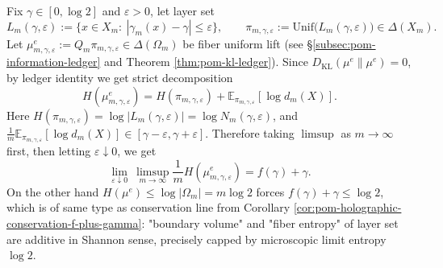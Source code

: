 \begin{remark}\label{rem:pom-layer-set-shannon-holography}
Fix \(\gamma\in[0,\log 2]\) and \(\varepsilon>0\), let layer set
\[
L_{m}(\gamma,\varepsilon):=\{x\in X_m:\ |\gamma_m(x)-\gamma|\le \varepsilon\},
\qquad
\pi_{m,\gamma,\varepsilon}:=\mathrm{Unif}\bigl(L_m(\gamma,\varepsilon)\bigr)\in\Delta(X_m).
\]
Let \(\mu^{e}_{m,\gamma,\varepsilon}:=Q_m\pi_{m,\gamma,\varepsilon}\in\Delta(\Omega_m)\) be fiber uniform lift (see \S\ref{subsec:pom-information-ledger} and Theorem \ref{thm:pom-kl-ledger}).
Since \(D_{\mathrm{KL}}(\mu^{e}\|\mu^{e})=0\), by ledger identity we get strict decomposition
\[
H(\mu^{e}_{m,\gamma,\varepsilon})
=H(\pi_{m,\gamma,\varepsilon})+\mathbb{E}_{\pi_{m,\gamma,\varepsilon}}[\log d_m(X)].
\]
Here \(H(\pi_{m,\gamma,\varepsilon})=\log|L_m(\gamma,\varepsilon)|=\log N_m(\gamma,\varepsilon)\), and
\(
\frac1m\mathbb{E}_{\pi_{m,\gamma,\varepsilon}}[\log d_m(X)]\in[\gamma-\varepsilon,\gamma+\varepsilon]
\).
Therefore taking \(\limsup\) as \(m\to\infty\) first, then letting \(\varepsilon\downarrow 0\), we get
\[
\lim_{\varepsilon\downarrow 0}\ \limsup_{m\to\infty}\frac{1}{m}H(\mu^{e}_{m,\gamma,\varepsilon})
=f(\gamma)+\gamma.
\]
On the other hand \(H(\mu^{e})\le \log|\Omega_m|=m\log 2\) forces
\(
f(\gamma)+\gamma\le \log 2
\), which is of same type as conservation line from Corollary \ref{cor:pom-holographic-conservation-f-plus-gamma}: "boundary volume" and "fiber entropy" of layer set are additive in Shannon sense, precisely capped by microscopic limit entropy \(\log 2\).
\end{remark}

